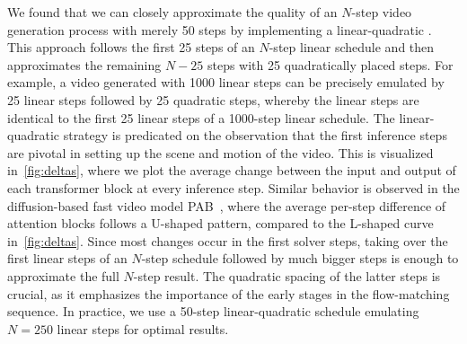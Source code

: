 We found that we can closely approximate the quality of an $N$-step video generation process with merely 50 steps by implementing a linear-quadratic \timeschedule.
This approach follows the first 25 steps of an $N$-step linear schedule and
then approximates the remaining $N-25$ steps with 25 quadratically placed steps.
For example, a video generated with 1000 linear steps can be precisely emulated by 25 linear steps followed by 25 quadratic steps,
whereby the linear steps are identical to the first 25 linear steps of a 1000-step linear schedule.
The linear-quadratic strategy is predicated on the observation that the first inference steps are pivotal in setting up the scene and motion of the video.
This is visualized in~\cref{fig:deltas}, where we plot the average change between the input and output of each transformer block at every inference step.
Similar behavior is observed in the diffusion-based fast video model PAB~\citep{zhao2024pab},
where the average per-step difference of attention blocks follows a U-shaped pattern,
compared to the L-shaped curve in~\cref{fig:deltas}.
Since most changes occur in the first solver steps,
taking over the first linear steps of an $N$-step schedule followed by much bigger steps is enough to approximate the full $N$-step result.
The quadratic spacing of the latter steps is crucial, as it emphasizes the importance of the early stages in the flow-matching sequence.
In practice, we use a 50-step linear-quadratic schedule emulating $N=250$ linear steps for optimal results.
